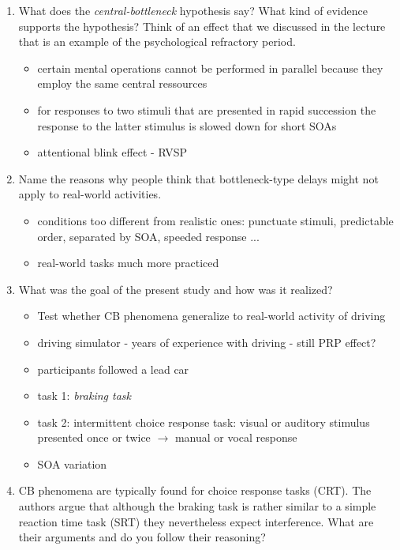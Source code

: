 \documentclass[12pt,english]{scrartcl}
\begin{document}
\begin{enumerate}
 \item What does the \textit{central-bottleneck} hypothesis say? What kind of evidence supports the hypothesis? Think of an effect that we discussed in the lecture that is an example of the psychological refractory period.

 \color{blue}
 \begin{itemize}
 \item certain mental operations cannot be performed in parallel because they employ the same central ressources
 \item for responses to two stimuli that are presented in rapid succession the response to the latter stimulus is slowed down for short SOAs
 \item attentional blink effect - RVSP
 \end{itemize}
  \color{black}

 \item Name the reasons why people think that bottleneck-type delays might not apply to real-world activities.

  \color{blue}
 \begin{itemize}
 \item conditions too different from realistic ones: punctuate stimuli, predictable order, separated by SOA, speeded response ...
\item real-world tasks much more practiced
 \end{itemize}
  \color{black}

\item What was the goal of the present study and how was it realized?

\color{blue}
 \begin{itemize}
 \item Test whether CB phenomena generalize to real-world activity of driving
 \item driving simulator - years of experience with driving - still PRP effect?
 \item participants followed a lead car
 \item task 1: \textit{braking task}
 \item task 2: intermittent choice response task: visual or auditory stimulus presented once or twice $\rightarrow$ manual or vocal response
 \item SOA variation
 \end{itemize}
  \color{black}

 \item CB phenomena are typically found for choice response tasks (CRT). The authors argue that although the braking task is rather similar to a simple reaction time task (SRT) they nevertheless expect interference. What are their arguments and do you follow their reasoning?


\end{enumerate}
\end{document}
